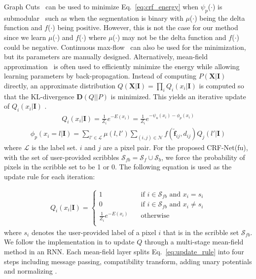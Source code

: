 \documentclass[10pt,journal,compsoc]{IEEEtran}
\begin{document}
Graph Cuts~\cite{Boykov2001, Szummer2008} can be used to minimize Eq.~\eqref{eq:crf_energy} when $\psi_p$($\cdot$) is submodular~\cite{Kolmogorov2004} such as when the segmentation is binary with $\mu$($\cdot$) being the delta function and $f$($\cdot$) being positive. However, this is not the case for our method since we learn $\mu$($\cdot$) and $f$($\cdot$) where $\mu$($\cdot$) may not be the delta function and $f$($\cdot$) could be negative. Continuous max-flow~\cite{Yuan2010} can also be used for the minimization, but its parameters are manually designed. Alternatively, mean-field approximation~\cite{Zheng2015a, Krahenbuhl2011, Vemulapalli2016} is often used to efficiently minimize the energy while allowing learning parameters by back-propagation. Instead of computing $P(\mathbf{X}|\mathbf{I})$ directly, an approximate distribution $Q(\mathbf{X}|\mathbf{I}) = \prod_iQ_i(x_i|\mathbf{I})$ is computed so that the KL-divergence $\mathbf{D}(Q||P)$ is minimized. This yields an iterative update of $Q_i(x_i|\mathbf{I})$ \cite{Zheng2015a, Krahenbuhl2011, Vemulapalli2016}. 
\begin{align}
Q_i(x_i|\mathbf{I})=\frac{1}{Z_i}e ^{-E(x_i)}=
\frac{1}{Z_i}e^{
-\psi_u(x_i)
-\phi_p(x_i)}\label{eq:update_rule}
\end{align}
\begin{align}
\phi_p(x_i=l|\mathbf{I})=
\sum_{l'\in \mathcal L}\mu(l,l')\sum_{(i,j)\in \mathcal N}f(\mathbf{\tilde{f}}_{ij}, d_{ij})Q_j(l'|\mathbf{I})   
\label{eq:update_rule2}
\end{align}
where $\mathcal L$ is the label set. $i$ and $j$ are a pixel pair. For the proposed CRF-Net(fu), with the set of user-provided scribbles $\mathcal S_{fb} = \mathcal S_f \cup \mathcal S_b$, we force the probability of pixels in the scribble set to be 1 or 0. The following equation is used as the update rule for each iteration:   

\begin{align}
Q_i(x_i|\mathbf{I})= 
\begin{cases}
1       & \quad \text{if } i \in \mathcal S_{fb}  \text{ and } x_i=s_i\\
0       & \quad \text{if } i \in \mathcal S_{fb}  \text{ and } x_i\neq s_i\\
\frac{1}{Z_i}e ^{-E(x_i)}  & \quad \text{otherwise } \\
\end{cases}\label{eq:update_rule_with_scrible}
\end{align}
where $s_i$ denotes the user-provided label of a pixel $i$ that is in the scribble set $\mathcal S_{fb}$. 
We follow the implementation in \cite{Zheng2015a} to update $Q$ through a multi-stage mean-field method in an RNN. Each mean-field layer splits Eq.~\eqref{eq:update_rule} into four steps including message passing, compatibility transform, adding unary potentials and normalizing \cite{Zheng2015a}.
\end{document}
